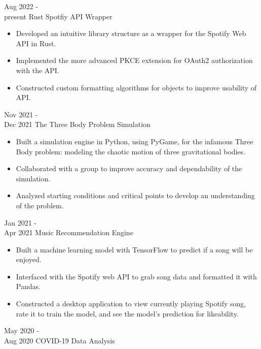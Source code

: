 \documentclass[9pt]{developercv} %
\begin{document}


\begin{entrylist}
	\entry
		{Aug 2022 -\\present}
		{Rust Spotfiy API Wrapper}
		{}
		{\begin{itemize}[noitemsep, topsep=1pt]
			\item Developed an intuitive library structure as a wrapper for the Spotify Web API in Rust. 
			\item Implemented the more advanced PKCE extension for OAuth2 authorization with the API. 
			\item Constructed custom formatting algorithms for objects to improve usability of API.
		\end{itemize}}
	\entry
		{Nov 2021 -\\Dec 2021}
		{The Three Body Problem Simulation}
		{}
		{\begin{itemize}[noitemsep, topsep=1pt]
			\item Built a simulation engine in Python, using PyGame, for the infamous Three Body problem: modeling the chaotic motion of three gravitational bodies. 
			\item Collaborated with a group to improve accuracy and dependability of the simulation.
			\item Analyzed starting conditions and critical points to develop an understanding of the problem.
		\end{itemize}}
	\entry
		{Jan 2021 -\\Apr 2021}
		{Music Recommendation Engine}
		{}
		{\begin{itemize}[noitemsep, topsep=1pt]
			\item Built a machine learning model with TensorFlow to predict if a song will be enjoyed.
			\item Interfaced with the Spotify web API to grab song data and formatted it with Pandas. 
			\item Constructed a desktop application to view currently playing Spotify song, rate it to train the model, and see the model's prediction for likeability. 
		\end{itemize}}
	\entry 
		{May 2020 -\\Aug 2020}
		{COVID-19 Data Analysis}
		{}
		{\begin{itemize}[noitemsep, topsep=1pt]

\end{itemize}}
\end{entrylist}
\end{document}

